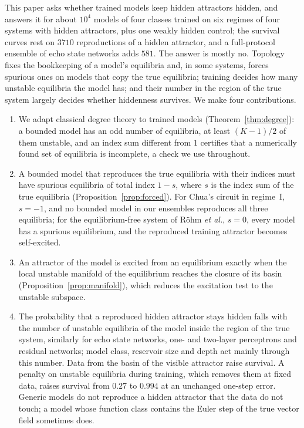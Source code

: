 \documentclass[aip,cha,reprint,amsmath,amssymb,longbibliography]{revtex4-2}
\theoremstyle{definition}
\begin{document}
This paper asks whether trained models keep hidden attractors hidden, and answers it for about $10^4$ models of four
classes trained on six regimes of four systems with hidden attractors, plus one weakly hidden control; the survival curves
rest on $3710$ reproductions of a hidden attractor, and a full-protocol ensemble of echo state networks adds $581$. The answer is mostly
no. Topology fixes the bookkeeping of a model's
equilibria and, in some systems, forces spurious ones on models that copy the true equilibria; training decides how many unstable equilibria the model has; and
their number in the region of the true system largely decides whether hiddenness survives. We make four contributions.
\begin{enumerate}
\item We adapt classical degree theory to trained models (Theorem~\ref{thm:degree}): a bounded model has an odd number of
equilibria, at least $(K-1)/2$ of them unstable, and an index sum different from $1$ certifies that a numerically found set
of equilibria is incomplete, a check we use throughout.
\item A bounded model that reproduces the true equilibria with their indices must have spurious equilibria of total index
$1-s$, where $s$ is the index sum of the true equilibria (Proposition~\ref{prop:forced}). For Chua's circuit in regime~I,
$s=-1$, and no bounded model in our ensembles reproduces all three equilibria; for the equilibrium-free system of R\"ohm
\textit{et al.},\cite{Rohm2021} $s=0$, every model has a spurious equilibrium, and the reproduced training attractor becomes
self-excited.
\item An attractor of the model is excited from an equilibrium exactly when the local unstable manifold of the equilibrium
reaches the closure of its basin (Proposition~\ref{prop:manifold}), which reduces the excitation test to the unstable
subspace.
\item The probability that a reproduced hidden attractor stays hidden falls with the number of unstable equilibria of the
model inside the region of the true system, similarly for echo state networks, one- and two-layer perceptrons and residual
networks; model class, reservoir size and depth act mainly through this number. Data from the basin of the visible
attractor raise survival. A penalty on unstable equilibria during training, which removes
them at fixed data, raises survival from $0.27$ to $0.994$ at an unchanged one-step error. Generic models do not reproduce a
hidden attractor that the data do not touch; a model whose function class contains the Euler step of the true vector
field sometimes does.
\end{enumerate}
\end{document}
